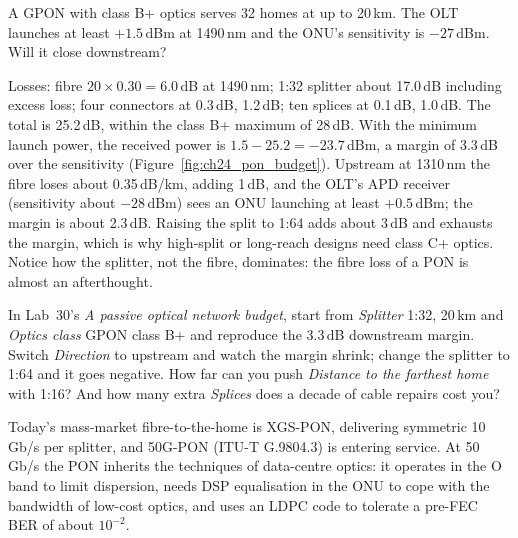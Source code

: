 \begin{worked}
A GPON with class B+ optics serves 32 homes at up to 20\,km. The OLT launches at least $+1.5$\,dBm at
1490\,nm and the ONU's sensitivity is $-27$\,dBm. Will it close downstream?

Losses: fibre $20\times0.30=6.0$\,dB at 1490\,nm; 1:32 splitter about 17.0\,dB including excess loss; four
connectors at 0.3\,dB, 1.2\,dB; ten splices at 0.1\,dB, 1.0\,dB. The total is 25.2\,dB, within the class B+
maximum of 28\,dB. With the minimum launch power, the received power is $1.5-25.2=-23.7$\,dBm, a margin of
3.3\,dB over the sensitivity (Figure~\ref{fig:ch24_pon_budget}). Upstream at 1310\,nm the fibre loses about
0.35\,dB/km, adding 1\,dB, and the OLT's APD receiver (sensitivity about $-28$\,dBm) sees an ONU launching
at least $+0.5$\,dBm; the margin is about 2.3\,dB. Raising the split to 1:64 adds about 3\,dB and exhausts
the margin, which is why high-split or long-reach designs need class C+ optics. Notice how the splitter,
not the fibre, dominates: the fibre loss of a PON is almost an afterthought.
\end{worked}


\begin{tryit}
In Lab~30's \emph{A passive optical network budget}, start from \emph{Splitter} 1:32, 20\,km and
\emph{Optics class} GPON class B+ and reproduce the 3.3\,dB downstream margin. Switch \emph{Direction} to
upstream and watch the margin shrink; change the splitter to 1:64 and it goes negative. How far can
you push \emph{Distance to the farthest home} with 1:16? And how many extra \emph{Splices} does a
decade of cable repairs cost you?
\end{tryit}


Today's mass-market fibre-to-the-home is XGS-PON, delivering symmetric 10\,Gb/s per splitter, and 50G-PON
(ITU-T G.9804.3) is entering service. At 50\,Gb/s the PON inherits the techniques of data-centre optics:
it operates in the O band to limit dispersion, needs DSP equalisation in the ONU to cope with the bandwidth
of low-cost optics, and uses an LDPC code to tolerate a pre-FEC BER of about $10^{-2}$.

